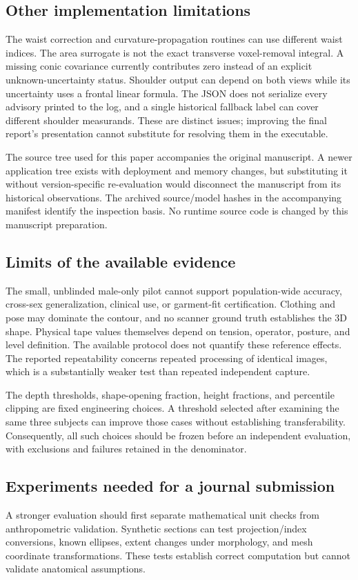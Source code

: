 \documentclass[11pt,a4paper]{article}
\numberwithin{equation}{section}
\begin{document}
\subsection{Other implementation limitations}
The waist correction and curvature-propagation routines can use different waist indices. The area surrogate is not the exact transverse voxel-removal integral. A missing conic covariance currently contributes zero instead of an explicit unknown-uncertainty status. Shoulder output can depend on both views while its uncertainty uses a frontal linear formula. The JSON does not serialize every advisory printed to the log, and a single historical fallback label can cover different shoulder measurands. These are distinct issues; improving the final report's presentation cannot substitute for resolving them in the executable.

The source tree used for this paper accompanies the original manuscript. A newer application tree exists with deployment and memory changes, but substituting it without version-specific re-evaluation would disconnect the manuscript from its historical observations. The archived source/model hashes in the accompanying manifest identify the inspection basis. No runtime source code is changed by this manuscript preparation.

\subsection{Limits of the available evidence}
The small, unblinded male-only pilot cannot support population-wide accuracy, cross-sex generalization, clinical use, or garment-fit certification. Clothing and pose may dominate the contour, and no scanner ground truth establishes the 3D shape. Physical tape values themselves depend on tension, operator, posture, and level definition. The available protocol does not quantify these reference effects. The reported repeatability concerns repeated processing of identical images, which is a substantially weaker test than repeated independent capture.

The depth thresholds, shape-opening fraction, height fractions, and percentile clipping are fixed engineering choices. A threshold selected after examining the same three subjects can improve those cases without establishing transferability. Consequently, all such choices should be frozen before an independent evaluation, with exclusions and failures retained in the denominator.

\subsection{Experiments needed for a journal submission}
A stronger evaluation should first separate mathematical unit checks from anthropometric validation. Synthetic sections can test projection/index conversions, known ellipses, extent changes under morphology, and mesh coordinate transformations. These tests establish correct computation but cannot validate anatomical assumptions.
\end{document}
